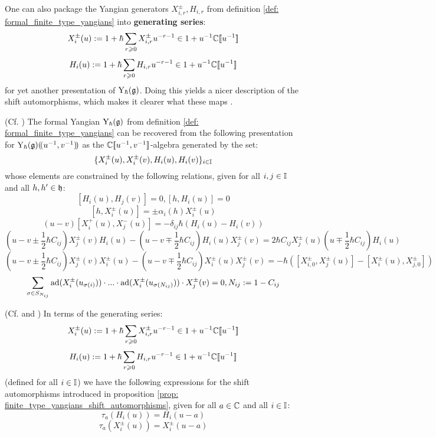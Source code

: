         One can also package the Yangian generators $X_{i, r}^{\pm}, H_{i, r}$ from definition \ref{def: formal_finite_type_yangians} into \textbf{generating  series}:
            $$X_i^{\pm}(u) := 1 + \hbar \sum_{r \geqslant 0} X_{i, r}^{\pm} u^{-r - 1} \in 1 + u^{-1} \mathbb{C}[\![u^{-1}]\!]$$
            $$H_i(u) := 1 + \hbar \sum_{r \geqslant 0} H_{i, r} u^{-r - 1} \in 1 + u^{-1} \mathbb{C}[\![u^{-1}]\!]$$
        for yet another presentation of $\mathrm{Y}_{\hbar}(\mathfrak{g})$. Doing this yields a nicer description of the shift automorphisms, which makes it clearer what these maps . 
        \begin{proposition} \label{prop: generating_series_for_finite_untwisted_yangians}
            (Cf. \cite[Proposition 2.3]{gautam_and_toledano_laredo_yangians_quantum_loop_algebras_and_abelian_difference_equations}) The formal Yangian $\mathrm{Y}_{\hbar}(\mathfrak{g})$ from definition \ref{def: formal_finite_type_yangians} can be recovered from the following presentation for $\mathrm{Y}_{\hbar}(\mathfrak{g})(\!(u^{-1}, v^{-1})\!)$ as the $\mathbb{C}[\![u^{-1}, v^{-1}]\!]$-algebra generated by the set:
                $$\{X_i^{\pm}(u), X_i^{\pm}(v), H_i(u), H_i(v)\}_{i \in \mathbb{I}}$$
            whose elements are constrained by the following relations, given for all $i, j \in \mathbb{I}$ and all $h, h' \in \mathfrak{h}$:
                $$[H_i(u), H_j(v)] = 0, [h, H_i(u)] = 0$$
                $$[h, X_i^{\pm}(u)] = \pm \alpha_i(h) X_i^{\pm}(u)$$
                $$(u - v) [X_i^+(u), X_j^-(u)] = -\delta_{ij} \hbar ( H_i(u) - H_i(v) )$$
                $$\left(u - v \pm \frac12 \hbar C_{ij}\right) X_j^{\pm}(v) H_i(u) - \left(u - v \mp  \frac12 \hbar C_{ij}\right) H_i(u) X_j^{\pm}(v) = 2 \hbar C_{ij} X_j^{\pm}(u) \left(u \mp \frac12 \hbar C_{ij}\right) H_i(u)$$
                $$\left(u - v \pm \frac12 \hbar C_{ij}\right) X_j^{\pm}(v) X_i^{\pm}(u) - \left(u - v \mp \frac12 \hbar C_{ij}\right) X_i^{\pm}(u) X_j^{\pm}(v) = -\hbar( [X_{i, 0}^{\pm}, X_j^{\pm}(u)] - [X_i^{\pm}(u), X_{j, 0}^{\pm}] )$$
                $$\sum_{\sigma \in S_{N_{ij}}} \mathrm{ad}( X_i^{\pm}( u_{\sigma(i)} ) ) \cdot ... \cdot \mathrm{ad}( X_i^{\pm}( u_{\sigma(N_{ij})} ) ) \cdot X_j^{\pm}(v) = 0, N_{ij} := 1 - C_{ij}$$
        \end{proposition}
        \begin{proposition} \label{prop: shift_automorphisms_via_generating_series}
            (Cf. \cite[Subsection 2.8]{gautam_and_toledano_laredo_yangians_quantum_loop_algebras_and_abelian_difference_equations} and \cite[Remark 2.4]{wendlandt_formal_shift_operators_on_yangian_doubles}) In terms of the generating series:
                $$X_i^{\pm}(u) := 1 + \hbar \sum_{r \geqslant 0} X_{i, r}^{\pm} u^{-r - 1} \in 1 + u^{-1} \mathbb{C}[\![u^{-1}]\!]$$
                $$H_i(u) := 1 + \hbar \sum_{r \geqslant 0} H_{i, r} u^{-r - 1} \in 1 + u^{-1} \mathbb{C}[\![u^{-1}]\!]$$
            (defined for all $i \in \mathbb{I}$) we have the following expressions for the shift automorphisms introduced in proposition \ref{prop: finite_type_yangians_shift_automorphisms}, given for all $a \in \mathbb{C}$ and all $i \in \mathbb{I}$:
                $$\tau_a(H_i(u)) = H_i(u - a)$$
                $$\tau_a(X_i^{\pm}(u)) = X_i^{\pm}(u - a)$$
        \end{proposition}

